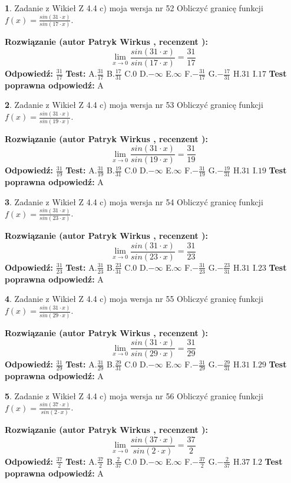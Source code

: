 \documentclass[12pt, a4paper]{article}
\theoremstyle{definition} %
\newtheorem{zad}{}
\newcommand{\zadStart}[1]{\begin{zad}#1\newline}
\newcommand{\zadStop}{\end{zad}}
\newcommand{\rozwStart}[2]{\noindent \textbf{Rozwiązanie (autor #1 , recenzent #2): }\newline}
\newcommand{\rozwStop}{\newline}
\newcommand{\odpStart}{\noindent \textbf{Odpowiedź:}\newline}
\newcommand{\odpStop}{\newline}
\newcommand{\testStart}{\noindent \textbf{Test:}\newline}
\newcommand{\testStop}{\newline}
\newcommand{\kluczStart}{\noindent \textbf{Test poprawna odpowiedź:}\newline}
\newcommand{\kluczStop}{\newline}
\begin{document}
\zadStart{Zadanie z Wikieł Z 4.4 c) moja wersja nr 52}
Obliczyć granicę funkcji $f(x)=\frac{sin(31\cdot x)}{sin(17\cdot x)}$.
\zadStop
\rozwStart{Patryk Wirkus}{}
$$\lim\limits_{x\to 0}\frac{sin(31\cdot x)}{sin(17\cdot x)}=
\frac{31}{17}$$
\rozwStop
\odpStart
$\frac{31}{17}$
\odpStop
\testStart
A.$\frac{31}{17}$
B.$\frac{17}{31}$
C.$0$
D.$-\infty$
E.$\infty$
F.$-\frac{31}{17}$
G.$-\frac{17}{31}$
H.$31$
I.$17$
\testStop
\kluczStart
A
\kluczStop



\zadStart{Zadanie z Wikieł Z 4.4 c) moja wersja nr 53}
Obliczyć granicę funkcji $f(x)=\frac{sin(31\cdot x)}{sin(19\cdot x)}$.
\zadStop
\rozwStart{Patryk Wirkus}{}
$$\lim\limits_{x\to 0}\frac{sin(31\cdot x)}{sin(19\cdot x)}=
\frac{31}{19}$$
\rozwStop
\odpStart
$\frac{31}{19}$
\odpStop
\testStart
A.$\frac{31}{19}$
B.$\frac{19}{31}$
C.$0$
D.$-\infty$
E.$\infty$
F.$-\frac{31}{19}$
G.$-\frac{19}{31}$
H.$31$
I.$19$
\testStop
\kluczStart
A
\kluczStop



\zadStart{Zadanie z Wikieł Z 4.4 c) moja wersja nr 54}
Obliczyć granicę funkcji $f(x)=\frac{sin(31\cdot x)}{sin(23\cdot x)}$.
\zadStop
\rozwStart{Patryk Wirkus}{}
$$\lim\limits_{x\to 0}\frac{sin(31\cdot x)}{sin(23\cdot x)}=
\frac{31}{23}$$
\rozwStop
\odpStart
$\frac{31}{23}$
\odpStop
\testStart
A.$\frac{31}{23}$
B.$\frac{23}{31}$
C.$0$
D.$-\infty$
E.$\infty$
F.$-\frac{31}{23}$
G.$-\frac{23}{31}$
H.$31$
I.$23$
\testStop
\kluczStart
A
\kluczStop



\zadStart{Zadanie z Wikieł Z 4.4 c) moja wersja nr 55}
Obliczyć granicę funkcji $f(x)=\frac{sin(31\cdot x)}{sin(29\cdot x)}$.
\zadStop
\rozwStart{Patryk Wirkus}{}
$$\lim\limits_{x\to 0}\frac{sin(31\cdot x)}{sin(29\cdot x)}=
\frac{31}{29}$$
\rozwStop
\odpStart
$\frac{31}{29}$
\odpStop
\testStart
A.$\frac{31}{29}$
B.$\frac{29}{31}$
C.$0$
D.$-\infty$
E.$\infty$
F.$-\frac{31}{29}$
G.$-\frac{29}{31}$
H.$31$
I.$29$
\testStop
\kluczStart
A
\kluczStop



\zadStart{Zadanie z Wikieł Z 4.4 c) moja wersja nr 56}
Obliczyć granicę funkcji $f(x)=\frac{sin(37\cdot x)}{sin(2\cdot x)}$.
\zadStop
\rozwStart{Patryk Wirkus}{}
$$\lim\limits_{x\to 0}\frac{sin(37\cdot x)}{sin(2\cdot x)}=
\frac{37}{2}$$
\rozwStop
\odpStart
$\frac{37}{2}$
\odpStop
\testStart
A.$\frac{37}{2}$
B.$\frac{2}{37}$
C.$0$
D.$-\infty$
E.$\infty$
F.$-\frac{37}{2}$
G.$-\frac{2}{37}$
H.$37$
I.$2$
\testStop
\kluczStart
A
\kluczStop
\end{document}
